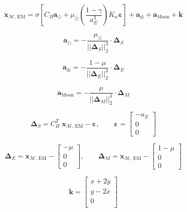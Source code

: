\documentclass[]{article}
\newcommand{\norm}[1]{\left| \left| #1 \right| \right|_{2}}
\begin{document}
	\begin{equation}
		\ddot{\mathbf{x}}_{\mathcal{M}\text{, EM}} = \sigma \left[ C_B  \mathbf{a}_{\odot} + \mu_\odot \left(\frac{1-\gamma}{a_E^3}\right) K_\alpha \boldsymbol{\varepsilon} \right] + \mathbf{a}_\oplus +  \mathbf{a}_\text{Moon}  + \mathbf{k}
	\end{equation}
	
	\begin{equation}
		\mathbf{a}_{\odot} = -\frac{\mu_\odot}{\norm{\boldsymbol{\Delta}_S}^3} \cdot \boldsymbol{\Delta}_S
	\end{equation}
	
	\begin{equation}
		\mathbf{a}_{\oplus} = -\frac{1-\mu}{\norm{\boldsymbol{\Delta}_E}^3} \cdot \boldsymbol{\Delta}_E
	\end{equation}
	
	\begin{equation}
	\mathbf{a}_\text{Moon} = -\frac{\mu}{\norm{\boldsymbol{\Delta}_M}^3} \cdot \boldsymbol{\Delta}_M
	\end{equation}
	
	\begin{equation}
		\boldsymbol{\Delta}_S = C_B^T \; \mathbf{x}_{\mathcal{M}\text{, EM}} - \boldsymbol{\varepsilon}, \quad\quad 
		\boldsymbol{\varepsilon} = \begin{bmatrix}
			-a_E \\ 0 \\ 0
		\end{bmatrix}
	\end{equation}
	
	\begin{equation}
		\boldsymbol{\Delta}_E = \mathbf{x}_{\mathcal{M}\text{, EM}} - \begin{bmatrix}
			 -\mu \\ 0 \\ 0
		\end{bmatrix}, \quad\quad \boldsymbol{\Delta}_M = \mathbf{x}_{\mathcal{M}\text{, EM}} - \begin{bmatrix}
		1 - \mu \\ 0 \\ 0
		\end{bmatrix}
	\end{equation}
	
	\begin{equation}
		\mathbf{k} = \begin{bmatrix}
			x + 2\dot{y} \\
			y - 2\dot{x} \\
			0 \\
		\end{bmatrix}
	\end{equation}
	
\end{document}
